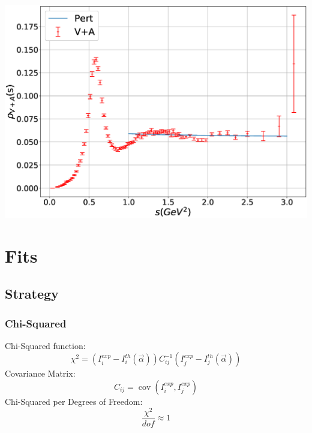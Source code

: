 \documentclass[fleqn]{beamer}
\DeclareMathOperator{\cov}{cov}
\begin{document}
\begin{frame}
  \includegraphics[width=\textwidth]{./images/specFuncAleph_VpA.eps}
\end{frame}


\section{Fits}
\subsection{Strategy}
\begin{frame}
  \frametitle{Chi-Squared}
  Chi-Squared function:
  \begin{equation}
    \chi^2 = ( I_i^{exp} - I_i^{th}(\vec \alpha)) C_{ij}^{-1} (I_j^{exp} - I_j^{th}(\vec \alpha))
  \end{equation}
  Covariance Matrix:
  \begin{equation}
    C_{ij} = \cov(I_i^{exp}, I_j^{exp})
  \end{equation}
  \vfill
  Chi-Squared per Degrees of Freedom:
  \begin{equation}
    \frac{\chi^2}{dof} \approx 1
  \end{equation}
\end{frame}
\end{document}
